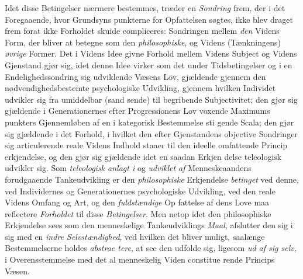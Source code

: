 Idet disse Betingelser nærmere bestemmes, træder en
\emph{Sondring} frem, der i det Foregaaende, hvor Grundsyns\-%
punkterne for Opfattelsen søgtes, ikke blev draget frem forat
ikke Forholdet skuide compliceres: Sondringen mellem \emph{den}
Videns Form, der bliver at betegne som den \emph{philosophiske},
og Videns (Tænkningens) \emph{øvrige} Former. Det i Videns Idee
givne Forhold mellem Videns Subject og Videns Gjenstand gjør
sig, idet denne Idee virker som det under Tidsbetingelser og
i en Endelighedssondring sig udviklende Væsens Lov, gjældende
gjennem den nødvendighedsbestemte psychologiske Udvikling,
gjennem hvilken Individet udvikler sig fra umiddelbar (sand\-%
sende) til begribende Subjectivitet; den gjør sig gjældende i
Generationernes efter Progressionens Lov voxende Maximums\-%
punkters Gjennemløben af en i kategorisk Bestemmelse sti\-%
gende Scala; den gjør sig gjældende i det Forhold, i hvilket
den efter Gjenstandens objective Sondringer sig articulerende
reale Videns Indhold staaer til den ideelle omfattende Princip\-%
erkjendelse, og den gjør sig gjældende idet en saadan Erkjen\-%
delse teleologisk udvikler sig. Som \emph{teleologisk anlagt i}
og \emph{udviklet af} Menneskeaandens forudgaaende Tankeudvikling
er den \emph{philosophiske} Erkjendelse \emph{betinget} ved denne, ved
Individernes og Generationernes psychologiske Udvikling, ved
den reale Videns Omfang og Art, og den \emph{fuldstændige} Op\-%
fattelse af dens Love maa reflectere \emph{Forholdet} til disse
\emph{Betingelser}. Men netop idet den philosophiske Erkjendelse
sees som den menneskelige Tankeudviklings \emph{Maal}, afslutter
den sig i sig med en \emph{indre Selvstændighed}, ved hvilken
det bliver muligt, saalænge Bestemmelserne holdes \emph{abstrac\-%
tere}, at see den udfolde sig, ligesom \emph{ud af sig selv}, i
Overensstemmelse med det al menneskelig Viden constitue\-%
rende Princips Væsen.

